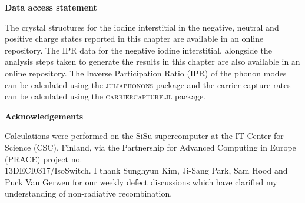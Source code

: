 \textbf{Data access statement}

The crystal structures for the iodine interstitial in the negative, neutral and positive charge states reported in this chapter are available
in an online repository.\autocite{WMD}
The IPR data for the negative iodine interstitial, alongside the analysis steps taken to generate the results in this chapter are also available in an online repository.\autocite{IPRMAPI} 
The Inverse Participation Ratio (IPR) of the phonon modes can be calculated using the \textsc{juliaphonons} package\autocite{juliaphonons}
and the carrier capture rates can be calculated using the \textsc{carriercapture.jl} package.\autocite{carriercapture}

\textbf{Acknowledgements}

Calculations were performed on the SiSu supercomputer at the IT Center for Science (CSC), Finland, via the Partnership for Advanced Computing in Europe (PRACE) project no. \\13DECI0317/IsoSwitch. I thank Sunghyun Kim, Ji-Sang Park, Sam Hood and Puck Van Gerwen for our weekly defect discussions which have clarified my understanding of non-radiative recombination.
